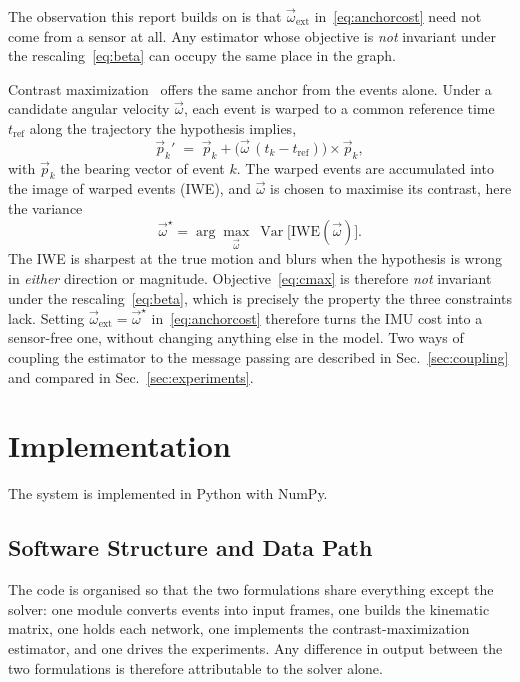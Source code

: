 \documentclass[journal]{IEEEtran}
\newcommand{\wvec}{\vec{\omega}}
\begin{document}
The observation this report builds on is that $\wvec_{\text{ext}}$
in~\eqref{eq:anchorcost} need not come from a sensor at all. Any estimator whose
objective is \emph{not} invariant under the rescaling~\eqref{eq:beta} can occupy
the same place in the graph.

Contrast maximization~\cite{gallego2018cmax} offers the same anchor from the
events alone. Under a candidate angular velocity $\wvec$, each event is warped to
a common reference time $t_{\text{ref}}$ along the trajectory the hypothesis
implies,
\begin{equation}
\vec{p}_k' \;=\; \vec{p}_k + \big(\wvec\,(t_k-t_{\text{ref}})\big)\times\vec{p}_k ,
\label{eq:warp}
\end{equation}
with $\vec{p}_k$ the bearing vector of event $k$. The warped events are
accumulated into the image of warped events (IWE), and $\wvec$ is chosen to
maximise its contrast, here the variance
\begin{equation}
\wvec^\star = \arg\max_{\wvec}\ \operatorname{Var}\!\big[\mathrm{IWE}(\wvec)\big].
\label{eq:cmax}
\end{equation}
The IWE is sharpest at the true motion and blurs when the hypothesis is wrong in
\emph{either} direction or magnitude. Objective~\eqref{eq:cmax} is therefore
\emph{not} invariant under the rescaling~\eqref{eq:beta}, which is precisely the
property the three constraints lack. Setting
$\wvec_{\text{ext}} = \wvec^\star$ in~\eqref{eq:anchorcost} therefore turns the
IMU cost into a sensor-free one, without changing anything else in the model.
Two ways of coupling the estimator to the message passing are described in
Sec.~\ref{sec:coupling} and compared in Sec.~\ref{sec:experiments}.


\section{Implementation}
\label{sec:implementation}

The system is implemented in Python with NumPy. 

\subsection{Software Structure and Data Path}

The code is organised so that the two formulations share everything except the
solver: one module converts events into input frames, one builds the kinematic
matrix, one holds each network, one implements the contrast-maximization
estimator, and one drives the experiments. Any difference in output between the
two formulations is therefore attributable to the solver alone.
\end{document}
